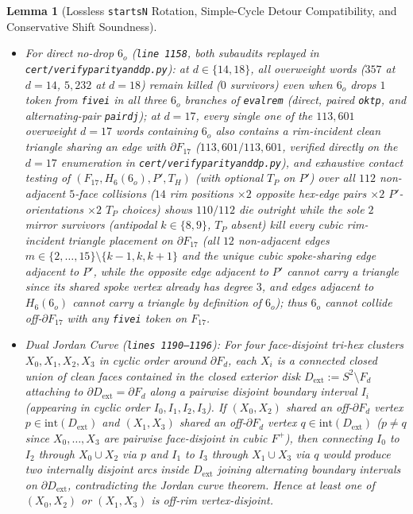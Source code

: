 \documentclass[11pt,reqno]{amsart}
\theoremstyle{plain}
\newtheorem{lemma}[theorem]{Lemma}
\theoremstyle{definition}
\theoremstyle{remark}
\DeclareRobustCommand{\_}{\ifmmode\text{\textunderscore}\else\textunderscore\allowbreak\fi}
\begin{document}
\begin{lemma}[Lossless \texttt{starts\_N} Rotation, Simple-Cycle Detour Compatibility, and Conservative Shift Soundness]
\begin{enumerate}[label=(\roman*),leftmargin=2.2em]
\begin{itemize}[leftmargin=1.5em]
\begin{itemize}[leftmargin=1.4em]
      \item For direct no-drop $6_o$ (\texttt{line 1158}, both subaudits replayed in \texttt{cert/verify\_parity\_and\_dp.py}): at $d \in \{14, 18\}$, all overweight words ($357$ at $d=14$, $5{,}232$ at $d=18$) remain killed ($0$ survivors) even when $6_o$ drops $1$ token from \texttt{five\_i} in all three $6_o$ branches of \texttt{eval\_rem} (direct, paired \texttt{ok\_tp}, and alternating-pair \texttt{pair\_dj}); at $d = 17$, every single one of the $113{,}601$ overweight $d = 17$ words containing $6_o$ also contains a rim-incident clean triangle sharing an edge with $\partial F_{17}$ ($113{,}601/113{,}601$, verified directly on the $d = 17$ enumeration in \texttt{cert/verify\_parity\_and\_dp.py}), and exhaustive contact testing of $(F_{17}, H_6(6_o), P', T_H)$ (with optional $T_P$ on $P'$) over all $112$ non-adjacent $5$-face collisions ($14$ rim positions $\times 2$ opposite hex-edge pairs $\times 2$ $P'$-orientations $\times 2$ $T_P$ choices) shows $110/112$ die outright while the sole $2$ mirror survivors (antipodal $k \in \{8, 9\}$, $T_P$ absent) kill every cubic rim-incident triangle placement on $\partial F_{17}$ (all $12$ non-adjacent edges $m \in \{2,\dots,15\} \setminus \{k-1, k, k+1\}$ and the unique cubic spoke-sharing edge adjacent to $P'$, while the opposite edge adjacent to $P'$ cannot carry a triangle since its shared spoke vertex already has degree $3$, and edges adjacent to $H_6(6_o)$ cannot carry a triangle by definition of $6_o$); thus $6_o$ cannot collide off-$\partial F_{17}$ with any \texttt{five\_i} token on $F_{17}$.
      \item \emph{Dual Jordan Curve (\texttt{lines 1190--1196}):} For four face-disjoint tri-hex clusters $X_0, X_1, X_2, X_3$ in cyclic order around $\partial F_d$, each $X_i$ is a connected closed union of clean faces contained in the closed exterior disk $D_{\mathrm{ext}} := S^2 \setminus F_d$ attaching to $\partial D_{\mathrm{ext}} = \partial F_d$ along a pairwise disjoint boundary interval $I_i$ (appearing in cyclic order $I_0, I_1, I_2, I_3$). If $(X_0, X_2)$ shared an off-$\partial F_d$ vertex $p \in \mathrm{int}(D_{\mathrm{ext}})$ and $(X_1, X_3)$ shared an off-$\partial F_d$ vertex $q \in \mathrm{int}(D_{\mathrm{ext}})$ ($p \neq q$ since $X_0, \dots, X_3$ are pairwise face-disjoint in cubic $F^+$), then connecting $I_0$ to $I_2$ through $X_0 \cup X_2$ via $p$ and $I_1$ to $I_3$ through $X_1 \cup X_3$ via $q$ would produce two internally disjoint arcs inside $D_{\mathrm{ext}}$ joining alternating boundary intervals on $\partial D_{\mathrm{ext}}$, contradicting the Jordan curve theorem. Hence at least one of $(X_0, X_2)$ or $(X_1, X_3)$ is off-rim vertex-disjoint.

\end{itemize}
\end{itemize}
\end{enumerate}
\end{lemma}
\end{document}
